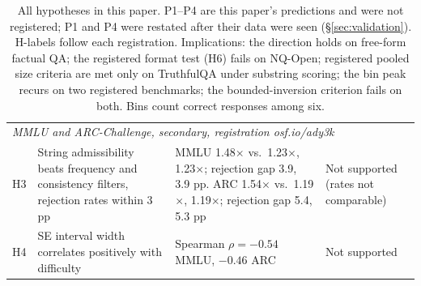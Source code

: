 \begin{table}[p]
\begin{tabular}{@{}lp{5.0cm}p{5.9cm}>{\raggedright\arraybackslash}p{2.2cm}@{}}
\midrule
\multicolumn{4}{l}{\textit{MMLU and ARC-Challenge, secondary, registration osf.io/ady3k}} \\
H3 & String admissibility beats frequency and consistency filters, rejection rates within 3 pp & MMLU 1.48$\times$ vs.\ 1.23$\times$, 1.23$\times$; rejection gap 3.9, 3.9 pp. ARC 1.54$\times$ vs.\ 1.19$\times$, 1.19$\times$; rejection gap 5.4, 5.3 pp & Not supported (rates not comparable) \\
H4 & SE interval width correlates positively with difficulty & Spearman $\rho=-0.54$ MMLU, $-0.46$ ARC & Not supported \\
\bottomrule
\end{tabular}
\caption{All hypotheses in this paper. P1--P4 are this paper's predictions and were not registered; P1 and P4 were restated after their data were seen (\S\ref{sec:validation}). H-labels follow each registration. Implications: the direction holds on free-form factual QA; the registered format test (H6) fails on NQ-Open; registered pooled size criteria are met only on TruthfulQA under substring scoring; the bin peak recurs on two registered benchmarks; the bounded-inversion criterion fails on both. Bins count correct responses among six.}
\label{tab:hypotheses}
\end{table}
